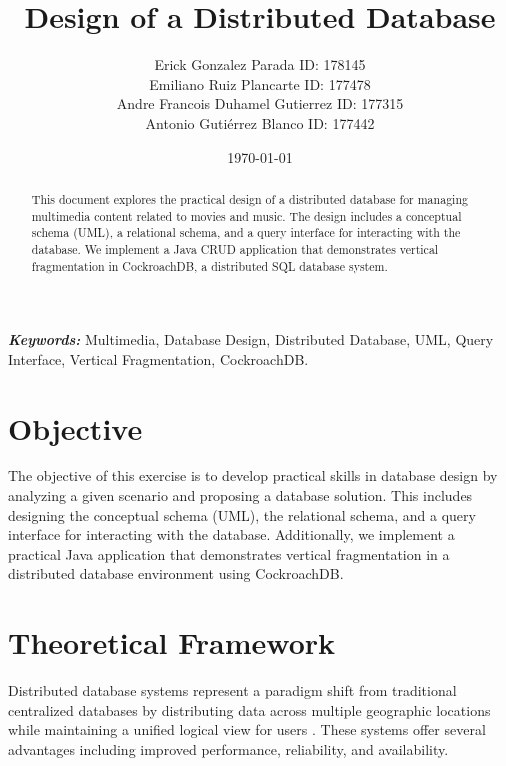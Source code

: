 \documentclass[twoside]{article}
\begin{document}

\title{Design of a Distributed Database}
\author{\small{Erick Gonzalez Parada ID: 178145}\\
  \small{Emiliano Ruiz Plancarte ID: 177478} \\
  \small{Andre Francois Duhamel Gutierrez ID: 177315} \\
\small{Antonio Gutiérrez Blanco ID: 177442}}
\date{\today}
\maketitle

\begin{abstract}
  \raggedright
  This document explores the practical design of a distributed database for managing multimedia content related to movies and music. The design includes a conceptual schema (UML), a relational schema, and a query interface for interacting with the database. We implement a Java CRUD application that demonstrates vertical fragmentation in CockroachDB, a distributed SQL database system.
\end{abstract}

\begin{justify}
  \textbf{\textit{Keywords:}} Multimedia, Database Design, Distributed Database, UML, Query Interface, Vertical Fragmentation, CockroachDB.
\end{justify}

\section{Objective}
The objective of this exercise is to develop practical skills in database design by analyzing a given scenario and proposing a database solution. This includes designing the conceptual schema (UML), the relational schema, and a query interface for interacting with the database. Additionally, we implement a practical Java application that demonstrates vertical fragmentation in a distributed database environment using CockroachDB.

\section{Theoretical Framework}

Distributed database systems represent a paradigm shift from traditional centralized databases by distributing data across multiple geographic locations while maintaining a unified logical view for users \cite{geekforgeeks}. These systems offer several advantages including improved performance, reliability, and availability.
\end{document}
